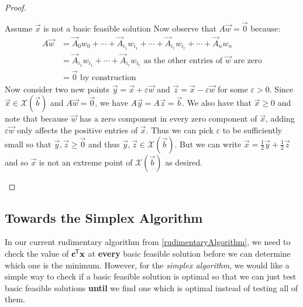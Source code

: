 \documentclass[../main.tex]{subfiles}
\begin{document}
\begin{proof}
\begin{proofdirection}{Assume $\vec{x}$ is not a basic feasible solution}
    Now observe that $A\vec{w} = \vec{0}$ because:
    \begin{align*}
      A \vec{w} &= \vec{A}_0 w_0 + \cdots + \vec{A}_{i_1} w_{i_1} + \cdots + \vec{A}_{i_r} w_{i_r} + \cdots + \vec{A}_{n} w_{n} \\
                &= \vec{A}_{i_1} w_{i_1} + \cdots + \vec{A}_{i_r} w_{i_r} \text{ as the other entries of $\vec{w}$ are zero} \\
                &= \vec{0} \text{ by construction}
    \end{align*}
    Now consider two new points $\vec{y} = \vec{x} + \varepsilon \vec{w}$ and $\vec{z} = \vec{x} - \varepsilon \vec{w}$ for some $\varepsilon > 0$.
    Since $\vec{x} \in \mathcal{X}(\vec{b})$ and $A \vec{w} = \vec{0}$, we have $A\vec{y} = A\vec{z} = \vec{b}$.
    We also have that $\vec{x} \geq 0$ and note that because $\vec{w}$ has a zero component in every zero component of $\vec{x}$, adding $\varepsilon \vec{w}$ only affects the positive entries of $\vec{x}$.
    Thus we can pick $\varepsilon$ to be sufficiently small so that $\vec{y}, \vec{z} \geq \vec{0}$ and thus $\vec{y}, \vec{z} \in \mathcal{X}(\vec{b})$.
    But we can write $\vec{x} = \frac{1}{2}\vec{y} + \frac{1}{2}\vec{z}$ and so $\vec{x}$ is not an extreme point of $\mathcal{X}(\vec{b})$ as desired.
  \end{proofdirection}
\end{proof}
\subsection{Towards the Simplex Algorithm}
In our current rudimentary algorithm from \cref{rudimentaryAlgorithm}, we need to check the value of $\mathbf{\bm{c}}^{{\mkern-1.5mu\mathsf{T}}} \mathbf{\bm{x}}$ at \textbf{every} basic feasible solution before we can determine which one is the minimum.
However, for the \textit{simplex algorithm}, we would like a simple way to check if a basic feasible solution is optimal so that we can just test basic feasible solutions \textbf{until} we find one which is optimal instead of testing all of them.
\end{document}
